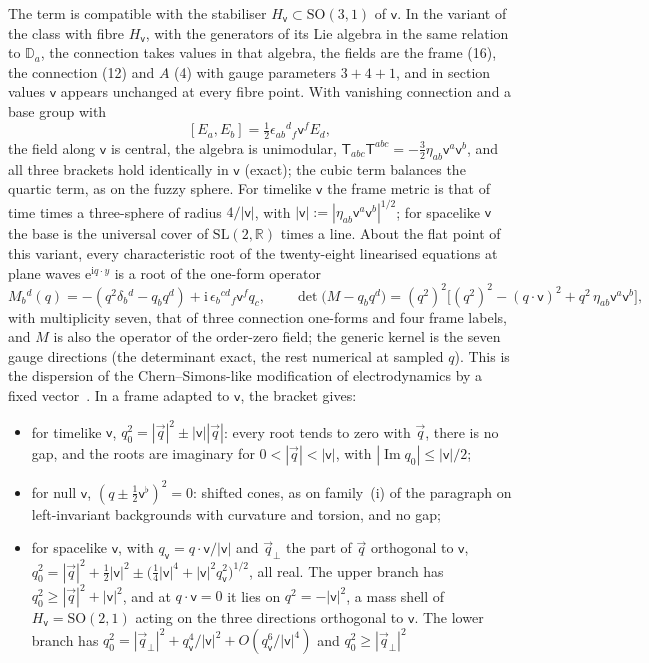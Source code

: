 The term is compatible with the stabiliser \(H_{\mathsf v}\subset\mathrm{SO}(3,1)\) of \(\mathsf v\). In the variant of the class with fibre \(H_{\mathsf v}\), with the generators of its Lie algebra in the same relation to \(\mathbb D_a\), the connection takes values in that algebra, the fields are the frame (16), the connection (12) and \(A\) (4) with gauge parameters \(3+4+1\), and in section values \(\mathsf v\) appears unchanged at every fibre point. With vanishing connection and a base group with
\[
[E_a,E_b]=\tfrac12\epsilon_{ab}{}^d{}_f\mathsf v^fE_d ,
\]
the field along \(\mathsf v\) is central, the algebra is unimodular, \(\mathsf T_{abc}\mathsf T^{abc}=-\tfrac32\eta_{ab}\mathsf v^a\mathsf v^b\), and all three brackets hold identically in \(\mathsf v\) (exact); the cubic term balances the quartic term, as on the fuzzy sphere. For timelike \(\mathsf v\) the frame metric is that of time times a three-sphere of radius \(4/|\mathsf v|\), with \(|\mathsf v|:=|\eta_{ab}\mathsf v^a\mathsf v^b|^{1/2}\); for spacelike \(\mathsf v\) the base is the universal cover of \(\mathrm{SL}(2,\mathbb R)\) times a line. About the flat point of this variant, every characteristic root of the twenty-eight linearised equations at plane waves \(\mathrm e^{\mathrm iq\cdot y}\) is a root of the one-form operator
\[
M_b{}^d(q)=-(q^2\delta_b{}^d-q_bq^d)+\mathrm i\,\epsilon_b{}^{cd}{}_f\mathsf v^fq_c,\qquad \det\bigl(M-q_bq^d\bigr)=(q^2)^2\bigl[(q^2)^2-(q\cdot\mathsf v)^2+q^2\,\eta_{ab}\mathsf v^a\mathsf v^b\bigr],
\]
with multiplicity seven, that of three connection one-forms and four frame labels, and \(M\) is also the operator of the order-zero field; the generic kernel is the seven gauge directions (the determinant exact, the rest numerical at sampled \(q\)). This is the dispersion of the Chern--Simons-like modification of electrodynamics by a fixed vector~\cite{CarrollFieldJackiw1990}. In a frame adapted to \(\mathsf v\), the bracket gives:
\begin{itemize}
\item for timelike \(\mathsf v\), \(q_0^2=|\vec q|^2\pm|\mathsf v||\vec q|\): every root tends to zero with \(\vec q\), there is no gap, and the roots are imaginary for \(0<|\vec q|<|\mathsf v|\), with \(|\operatorname{Im}q_0|\le|\mathsf v|/2\);
\item for null \(\mathsf v\), \((q\pm\tfrac12\mathsf v^\flat)^2=0\): shifted cones, as on family~(i) of the paragraph on left-invariant backgrounds with curvature and torsion, and no gap;
\item for spacelike \(\mathsf v\), with \(q_{\mathsf v}=q\cdot\mathsf v/|\mathsf v|\) and \(\vec q_\perp\) the part of \(\vec q\) orthogonal to \(\mathsf v\), \(q_0^2=|\vec q|^2+\tfrac12|\mathsf v|^2\pm\bigl(\tfrac14|\mathsf v|^4+|\mathsf v|^2q_{\mathsf v}^2\bigr)^{1/2}\), all real. The upper branch has \(q_0^2\ge|\vec q|^2+|\mathsf v|^2\), and at \(q\cdot\mathsf v=0\) it lies on \(q^2=-|\mathsf v|^2\), a mass shell of \(H_{\mathsf v}=\mathrm{SO}(2,1)\) acting on the three directions orthogonal to \(\mathsf v\). The lower branch has \(q_0^2=|\vec q_\perp|^2+q_{\mathsf v}^4/|\mathsf v|^2+O(q_{\mathsf v}^6/|\mathsf v|^4)\) and \(q_0^2\ge|\vec q_\perp|^2\)
\end{itemize}
